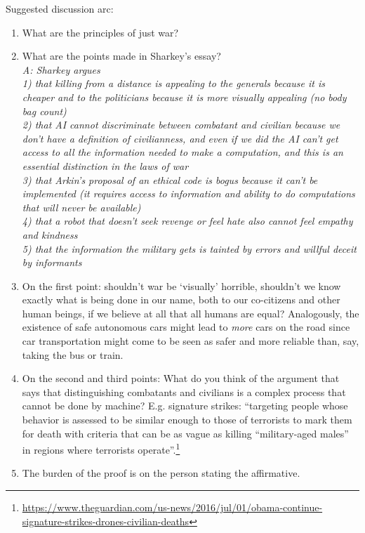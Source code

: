 \documentclass[letta4 paper]{article}
\numberwithin{equation}{section}
\newcommand{\0}{\mathbf{0}}
\begin{document}
	Suggested discussion arc:
	\begin{enumerate}
		\item What are the principles of just war?
		
		\item What are the points made in Sharkey's essay?
		\\
		\textit{A: Sharkey argues \\
			1) that killing from a distance is appealing to the generals because it is cheaper and to the politicians because it is more visually appealing (no body bag count) \\
			2) that AI cannot discriminate between combatant and civilian because we don't have a definition of civilianness, and even if we did the AI can't get access to all the information needed to make a computation, and this is an essential distinction in the laws of war 
			\\3) that Arkin's proposal of an ethical code is bogus because it can't be implemented (it requires access to information and ability to do computations that will never be available)
			\\4) that a robot that doesn't seek revenge or feel hate also cannot feel empathy and kindness
			\\5) that the information the military gets is tainted by errors and willful deceit by informants}
		
		\item On the first point: shouldn't war be `visually' horrible, shouldn't we know exactly what is being done in our name, both to our co-citizens and other human beings, if we believe at all that all humans are equal?
		Analogously, the existence of safe autonomous cars might lead to \textit{more} cars on the road since car transportation might come to be seen as safer and more reliable than, say, taking the bus or train.
		
		\item On the second and third points: What do you think of the argument that says that distinguishing combatants and civilians is a complex process that cannot be done by machine?
		E.g. signature strikes: ``targeting people whose behavior is assessed to be similar enough to those of terrorists to mark them for death with criteria that can be as vague as killing ``military-aged males'' in regions where terrorists operate''.\footnote{\url{https://www.theguardian.com/us-news/2016/jul/01/obama-continue-signature-strikes-drones-civilian-deaths}}
		
		\item The burden of the proof is on the person stating the affirmative. 
		

\end{enumerate}
\end{document}
